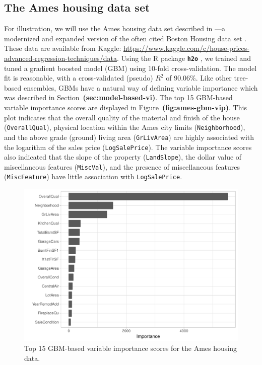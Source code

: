 \documentclass[12pt]{article}
\newcommand{\pkg}[1]{\texorpdfstring%
{{\normalfont\fontseries{b}\selectfont #1}}%
{#1}}
\def\code#1{\texttt{#1}}
\def\pkg#1{\textbf{\texttt{#1}}}
\def\ref#1{\textbf{(#1)}}
\begin{document}
\subsection{The Ames housing data set}
\label{sec:ames}

For illustration, we will use the Ames housing data set described in \citep{ames-cock-2011}---a modernized and expanded version of the often cited Boston Housing data set \citep{harrison-1978-hedonic}. These data are available from Kaggle: \url{https://www.kaggle.com/c/house-prices-advanced-regression-techniques/data}. Using the R package \pkg{h2o} \citep{h2o-pkg}, we trained and tuned a gradient boosted model (GBM) \citep{friedman-2001-greedy} using 10-fold cross-validation. The model fit is reasonable, with a cross-validated (pseudo) $R^2$ of 90.06\%. Like other tree-based ensembles, GBMs have a natural way of defining variable importance which was described in Section~\ref{sec:model-based-vi}. The top 15 GBM-based variable importance scores are displayed in Figure~\ref{fig:ames-gbm-vip}. This plot indicates that the overall quality of the material and finish of the house (\code{OverallQual}), physical location within the Ames city limits (\code{Neighborhood}), and the above grade (ground) living area (\code{GrLivArea}) are highly associated with the logarithm of the sales price (\code{LogSalePrice}). The variable importance scores also indicated that the slope of the property (\code{LandSlope}), the dollar value of miscellaneous features (\code{MiscVal}), and the presence of miscellaneous features (\code{MiscFeature})  have little association with \code{LogSalePrice}.

\begin{figure}[!htb]
  \centering
  \includegraphics[width=1.0\textwidth]{ames-gbm-vip}
  \caption{Top 15 GBM-based variable importance scores for the Ames housing data. \label{fig:ames-gbm-vip}}
\end{figure}
\end{document}
